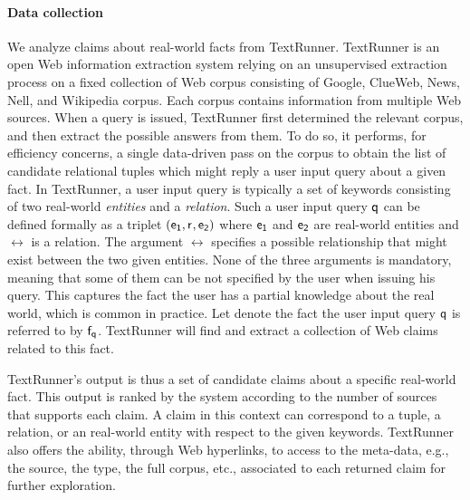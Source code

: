 \paragraph*{Data collection} We analyze claims about real-world facts
from TextRunner.
TextRunner is an open Web information extraction system relying
on an unsupervised extraction process on a fixed collection of 
Web corpus consisting of Google, ClueWeb, News, Nell, and Wikipedia 
corpus. Each corpus contains information from multiple Web sources. 
When a query is issued, TextRunner first determined the relevant
corpus, and then extract the possible answers from them. 
To do so, it performs, for efficiency concerns, a single data-driven
pass on the corpus to obtain the list of candidate relational tuples 
which might reply a user input query about a given fact. In TextRunner, 
a user input query is typically a set of keywords
consisting  of two real-world \emph{entities} and a \emph{relation}. Such
a user input query $\mathsf{q}$ can be defined formally as a triplet $(\mathsf{e_{1}}, \mathsf{r}_{}, \mathsf{e_{2}})$
where $\mathsf{e_{1}}$ and $\mathsf{e_{2}}$ are real-world entities and $\rel{}$ is a relation. The argument $\rel{}$ 
specifies a possible relationship that might exist between the two given entities. None of the three 
arguments is mandatory, meaning that some of them can be not specified by the user when issuing 
his query. This captures the fact the user has a partial knowledge about the real world, which is 
common in practice. Let denote the fact the user input query $\mathsf{q}$ is referred to by $\mathsf{f}_{\mathsf{q}}$. 
TextRunner will find and extract a collection of Web claims related to this fact.

TextRunner's output is thus a set of candidate claims about a specific real-world fact.
This output is ranked by the system according to the number of sources that supports each
claim. A claim in this context can correspond to a tuple, a relation, or an real-world entity 
with respect to the given keywords. TextRunner also offers the ability, through Web hyperlinks, 
to access to the meta-data, e.g., the source, the type, the full corpus, etc., associated to each 
returned claim for further exploration. 

